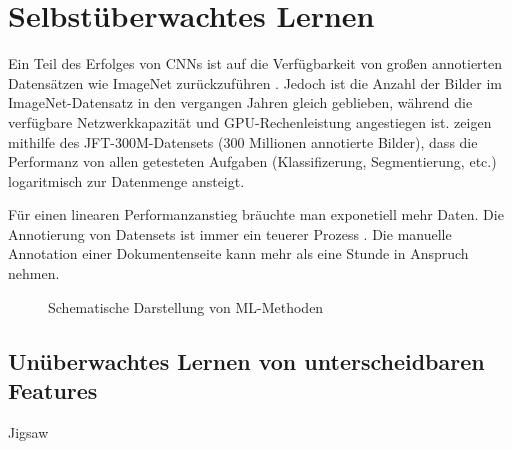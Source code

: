 \chapter{Selbstüberwachtes Lernen}
\label{chap:selfsupervised}
Ein Teil des Erfolges von CNNs ist auf die Verfügbarkeit von großen annotierten Datensätzen wie ImageNet zurückzuführen
\autocite{SunRevisitingUnreasonableEffectiveness2017}.
Jedoch ist die Anzahl der Bilder im ImageNet-Datensatz in den vergangen Jahren gleich geblieben, während die  verfügbare Netzwerkkapazität und GPU-Rechenleistung angestiegen ist.
\citeauthor{SunRevisitingUnreasonableEffectiveness2017} zeigen mithilfe des JFT-300M-Datensets (300 Millionen annotierte Bilder), dass die Performanz von allen getesteten Aufgaben (Klassifizerung, Segmentierung, etc.)
logaritmisch zur Datenmenge ansteigt. 

Für einen linearen Performanzanstieg bräuchte man exponetiell mehr Daten.
Die Annotierung von Datensets ist immer ein teuerer Prozess \autocite[988]{ValvenyDatasetsAnnotationsDocument2014}.
Die manuelle Annotation einer Dokumentenseite kann mehr als eine Stunde in Anspruch nehmen. 




\begin{figure}[htbp!]
    \centering
    \caption{Schematische Darstellung von ML-Methoden}
    \label{fig:all}
    
    
\end{figure}
\vspace{0.5cm}

\section{Unüberwachtes Lernen von unterscheidbaren Features}


Jigsaw
\cite{NorooziUnsupervisedLearningVisual2016}
